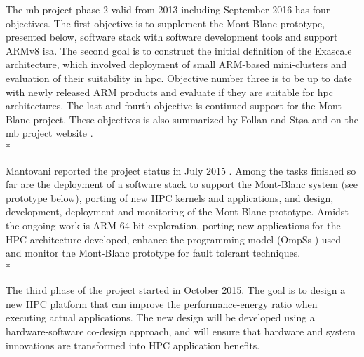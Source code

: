 The \gls{mb} project phase 2 valid from 2013 including September 2016 has four objectives. The first objective is to supplement the Mont-Blanc prototype, presented below, software stack with software development tools and support ARMv8 \gls{isa}. The second goal is to construct the initial definition of the Exascale architecture, which involved deployment of small ARM-based mini-clusters and evaluation of their suitability in \gls{hpc}. Objective number three is to be up to date with newly released ARM products and evaluate if they are suitable for \gls{hpc} architectures. The last and fourth objective is continued support for the Mont Blanc project. These objectives is also summarized by Follan and Støa \cite{mt:T&S} and on the \gls{mb} project website \cite{MB}.\\*

Mantovani reported the project status in July 2015 \cite{p:MB-15}. Among the tasks finished so far are the deployment of a software stack to support the Mont-Blanc system (see prototype below), porting of new HPC kernels and applications, and design, development, deployment and monitoring of the Mont-Blanc prototype. Amidst the ongoing work is ARM 64 bit exploration, porting new applications for the HPC architecture developed, enhance the programming model (OmpSs \cite{OMPSS}) used and monitor the Mont-Blanc prototype for fault tolerant techniques. \\*

The third phase of the project started in October 2015. The goal is to design a new HPC platform that can improve the performance-energy ratio when executing actual applications. The new design will be developed using a hardware-software co-design approach, and will ensure that hardware and system innovations are transformed into HPC application benefits.

